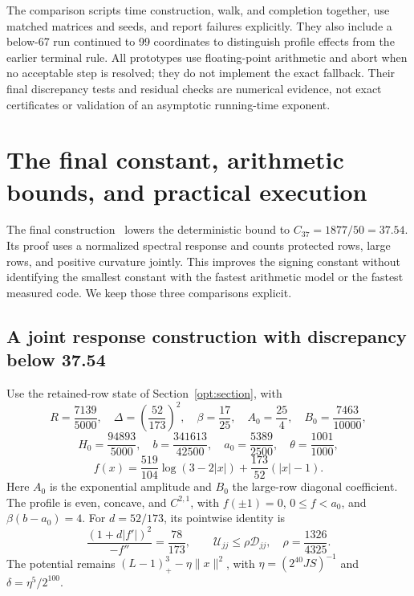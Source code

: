 \documentclass[11pt]{amsart}
\theoremstyle{definition}\newtheorem{definition}[theorem]{Definition}
\theoremstyle{remark}\newtheorem{remark}[theorem]{Remark}
\numberwithin{equation}{section}
\begin{document}
The comparison scripts time construction, walk, and completion together,
use matched matrices and seeds, and report failures explicitly. They
also include a below-67 run continued to 99 coordinates to distinguish
profile effects from the earlier terminal rule. All prototypes use
floating-point arithmetic and abort when no acceptable step is resolved;
they do not implement the exact fallback. Their final discrepancy tests
and residual checks are numerical evidence, not exact certificates or
validation of an asymptotic running-time exponent.

\section{The final constant, arithmetic bounds, and practical execution}
\label{fin:section}
The final construction~\cite{Final37} lowers the deterministic bound to
$C_{37}=1877/50=37.54$. Its proof uses a normalized spectral response
and counts protected rows, large rows, and positive curvature jointly.
This improves the signing constant without identifying the smallest
constant with the fastest arithmetic model or the fastest measured code.
We keep those three comparisons explicit.

\subsection{A joint response construction with discrepancy below 37.54}
\label{fin:construction}
Use the retained-row state of Section~\ref{opt:section}, with
\[
 R=\frac{7139}{5000},\quad \Delta=\left(\frac{52}{173}\right)^2,
 \quad\beta=\frac{17}{25},\quad A_0=\frac{25}{4},\quad B_0=\frac{7463}{10000},
\]
\[
 H_0=\frac{94893}{5000},\quad b=\frac{341613}{42500},\quad
 a_0=\frac{5389}{2500},\quad\theta=\frac{1001}{1000},
\]
\[
 f(x)=\frac{519}{104}\log(3-2|x|)+\frac{173}{52}(|x|-1).
\]
Here $A_0$ is the exponential amplitude and $B_0$ the large-row
diagonal coefficient. The profile is even, concave, and $C^{2,1}$,
with $f(\pm1)=0$, $0\le f<a_0$, and $\beta(b-a_0)=4$.
For $d=52/173$, its pointwise identity is
\[
 \frac{(1+d|f'|)^2}{-f''}=\frac{78}{173},\qquad
 \mathcal U_{jj}\le\rho\mathcal D_{jj},\quad \rho=\frac{1326}{4325}.
\]
The potential remains $(L-1)_+^3-\eta\|x\|^2$, with
$\eta=(2^{40}JS)^{-1}$ and $\delta=\eta^5/2^{100}$.
\end{document}
